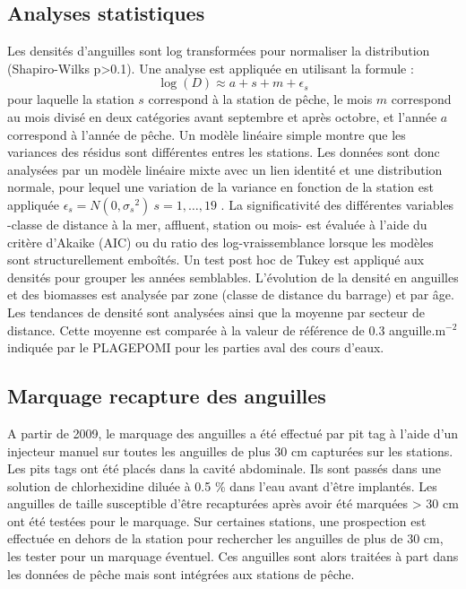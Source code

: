 \documentclass[10pt,twocolumn,titlepage,twoside]{article}\usepackage[]{graphicx}\usepackage[]{color}
\begin{document}
\subsection{Analyses statistiques}
Les densités d'anguilles sont log transformées pour
normaliser la distribution (Shapiro-Wilks p{\textgreater}0.1). Une
analyse est appliquée en utilisant la formule :
\begin{equation*}
\log (D){\approx}a+s+m+\epsilon_s
\end{equation*}
pour laquelle la station $s$ correspond à la station de pêche, le mois $m$
correspond au mois divisé en deux catégories avant septembre et après octobre,
et l'année $a$ correspond à l'année de pêche. Un modèle linéaire simple montre
que les variances des résidus sont différentes entres les stations. Les
 données sont donc analysées par un modèle linéaire mixte
 \citep{pinheiro_nlme_2013} avec un lien identité et une distribution normale, 
 pour lequel une variation de la variance en fonction de la station est appliquée $\epsilon_s=N(0,{\sigma_{s}}^2)
~s=1,\dots,19$ \citep{zuur_mixed_2009}. La significativité des différentes
variables -classe de distance à la mer, affluent, station ou mois- est évaluée à
l'aide du critère d'Akaike (AIC) ou du ratio des log-vraissemblance lorsque les modèles sont structurellement emboîtés. Un test
post hoc de Tukey est appliqué aux densités pour grouper les années semblables.
L'évolution de la densité en anguilles et des biomasses est analysée par zone (classe de
distance du barrage) et par âge. Les tendances de densité sont analysées ainsi
que la moyenne par secteur de distance. Cette moyenne est comparée à la valeur de référence de 0.3
anguille.m$^{-2}$ indiquée par le PLAGEPOMI pour les parties aval des cours
d'eaux.
\subsection{Marquage recapture des anguilles}
A partir de 2009, le marquage des anguilles a été effectué par pit tag à l'aide
d'un injecteur manuel sur toutes les anguilles de plus 30 cm capturées sur les stations. Les
pits tags ont été placés dans la cavité abdominale.
Ils sont passés dans une solution de chlorhexidine diluée à 0.5 \% dans l'eau 
avant d'être
implantés.
Les anguilles de taille susceptible d'être recapturées après avoir été marquées > 30 cm ont été testées pour le marquage. 
Sur certaines stations, une prospection est effectuée en dehors de la station
pour rechercher les anguilles de plus de 30 cm, les tester pour un marquage
éventuel. Ces anguilles sont alors traitées à part dans les
données de pêche mais sont intégrées aux stations de pêche.
\end{document}
